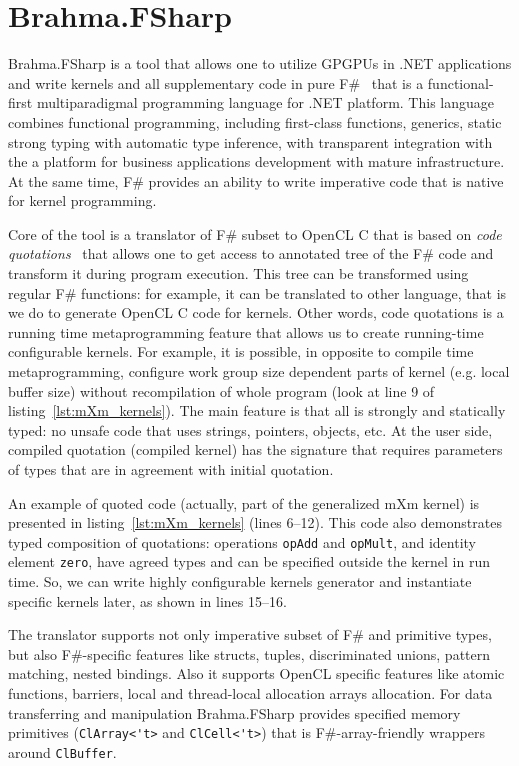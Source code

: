 \section{Brahma.FSharp}

Brahma.FSharp is a tool that allows one to utilize GPGPUs in .NET applications and write kernels and all supplementary code in pure F\#~\cite{fsharp} that is a functional-first multiparadigmal programming language for .NET platform.
This language combines functional programming, including first-class functions, generics, static strong typing with automatic type inference, with transparent integration with the a platform for business applications development with mature infrastructure.
At the same time, F\# provides an ability to write imperative code that is native for kernel programming.

Core of the tool is a translator of F\# subset to OpenCL C that is based on \emph{code quotations}~\cite{FSharpQuotations} that allows one to get access to annotated tree of the F\# code and transform it during program execution.
This tree can be transformed using regular F\# functions: for example, it can be translated to other language, that is we do to generate OpenCL C code for kernels.
Other words, code quotations is a running time metaprogramming feature that allows us to create running-time configurable kernels.
For example, it is possible, in opposite to compile time metaprogramming, configure work group size dependent parts of kernel (e.g. local buffer size) without recompilation of whole program (look at line 9 of listing~\ref{lst:mXm_kernels}).
The main feature is that all is strongly and statically typed: no unsafe code that uses strings, pointers, objects, etc.
At the user side, compiled quotation (compiled kernel) has the signature that requires parameters of types that are in agreement with initial quotation.

An example of quoted code (actually, part of the generalized mXm kernel) is presented in listing~\ref{lst:mXm_kernels} (lines 6--12).
This code also demonstrates typed composition of quotations: operations \verb|opAdd| and \verb|opMult|, and identity element \verb|zero|, have agreed types and can be specified outside the kernel in run time.
So, we can write highly configurable kernels generator and instantiate specific kernels later, as shown in lines 15--16.

The translator supports not only imperative subset of F\# and primitive types, but also F\#-specific features like structs, tuples, discriminated unions, pattern matching, nested bindings.
Also it supports OpenCL specific features like atomic functions, barriers, local and thread-local allocation arrays allocation.
For data transferring and manipulation Brahma.FSharp provides specified memory primitives (\verb|ClArray<'t>| and \verb|ClCell<'t>|) that is F\#-array-friendly wrappers around \texttt{ClBuffer}.

